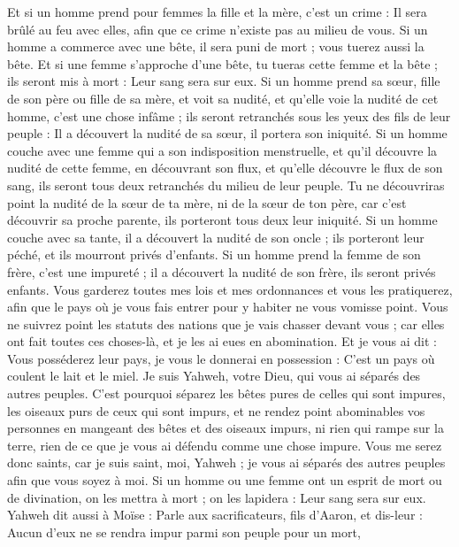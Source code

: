 \begin{multicols}{2}
Et si un homme prend pour femmes la fille et la mère, c'est un crime : Il sera brûlé au feu avec elles, afin que ce crime n’existe pas au milieu de vous.
Si un homme a commerce avec une bête, il sera puni de mort ; vous tuerez aussi la bête.
Et si une femme s’approche d’une bête, tu tueras cette femme et la bête ; ils seront mis à mort : Leur sang sera sur eux.
Si un homme prend sa sœur, fille de son père ou fille de sa mère, et voit sa nudité, et qu'elle voie la nudité de cet homme, c'est une chose infâme ; ils seront retranchés sous les yeux des fils de leur peuple : Il a découvert la nudité de sa sœur, il portera son iniquité.
Si un homme couche avec une femme qui a son indisposition menstruelle, et qu'il découvre la nudité de cette femme, en découvrant son flux, et qu'elle découvre le flux de son sang, ils seront tous deux retranchés du milieu de leur peuple.
Tu ne découvriras point la nudité de la sœur de ta mère, ni de la sœur de ton père, car c’est découvrir sa proche parente, ils porteront tous deux leur iniquité.
Si un homme couche avec sa tante, il a découvert la nudité de son oncle ; ils porteront leur péché, et ils mourront privés d'enfants.
Si un homme prend la femme de son frère, c'est une impureté ; il a découvert la nudité de son frère, ils seront privés enfants.
Vous garderez toutes mes lois et mes ordonnances et vous les pratiquerez, afin que le pays où je vous fais entrer pour y habiter ne vous vomisse point.
Vous ne suivrez point les statuts des nations que je vais chasser devant vous ; car elles ont fait toutes ces choses-là, et je les ai eues en abomination.
Et je vous ai dit : Vous posséderez leur pays, je vous le donnerai en possession : C'est un pays où coulent le lait et le miel. Je suis Yahweh, votre Dieu, qui vous ai séparés des autres peuples.
C'est pourquoi séparez les bêtes pures de celles qui sont impures, les oiseaux purs de ceux qui sont impurs, et ne rendez point abominables vos personnes en mangeant des bêtes et des oiseaux impurs, ni rien qui rampe sur la terre, rien de ce que je vous ai défendu comme une chose impure.
Vous me serez donc saints, car je suis saint, moi, Yahweh ; je vous ai séparés des autres peuples afin que vous soyez à moi.
Si un homme ou une femme ont un esprit de mort ou de divination, on les mettra à mort ; on les lapidera : Leur sang sera sur eux.
\VerseOne{}Yahweh dit aussi à Moïse : Parle aux sacrificateurs, fils d'Aaron, et dis-leur : Aucun d'eux ne se rendra impur parmi son peuple pour un mort,

\end{multicols}
